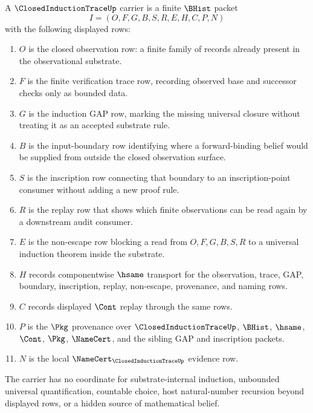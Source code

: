 \begin{definition}
\label{def:closed-induction-trace-carrier}
A $\ClosedInductionTraceUp$ carrier is a finite $\BHist$ packet
$$
I=(O,F,G,B,S,R,E,H,C,P,N)
$$
with the following displayed rows:
\begin{enumerate}
\item $O$ is the closed observation row: a finite family of records already present in the observational substrate.
\item $F$ is the finite verification trace row, recording observed base and successor checks only as bounded data.
\item $G$ is the induction GAP row, marking the missing universal closure without treating it as an accepted substrate rule.
\item $B$ is the input-boundary row identifying where a forward-binding belief would be supplied from outside the closed observation surface.
\item $S$ is the inscription row connecting that boundary to an inscription-point consumer without adding a new proof rule.
\item $R$ is the replay row that shows which finite observations can be read again by a downstream audit consumer.
\item $E$ is the non-escape row blocking a read from $O,F,G,B,S,R$ to a universal induction theorem inside the substrate.
\item $H$ records componentwise $\hsame$ transport for the observation, trace, GAP, boundary, inscription, replay, non-escape, provenance, and naming rows.
\item $C$ records displayed $\Cont$ replay through the same rows.
\item $P$ is the $\Pkg$ provenance over $\ClosedInductionTraceUp$, $\BHist$, $\hsame$, $\Cont$, $\Pkg$, $\NameCert$, and the sibling GAP and inscription packets.
\item $N$ is the local $\NameCert_{\ClosedInductionTraceUp}$ evidence row.
\end{enumerate}
The carrier has no coordinate for substrate-internal induction, unbounded universal quantification, countable choice, host natural-number recursion beyond displayed rows, or a hidden source of mathematical belief.
\end{definition}

